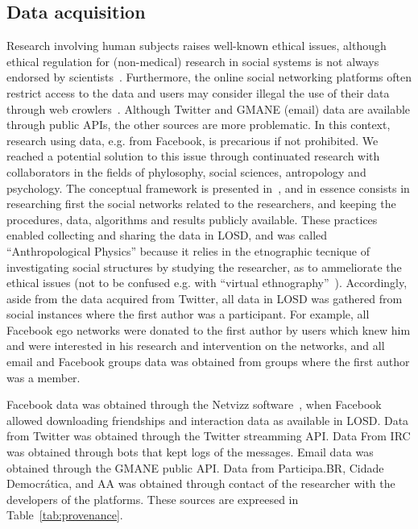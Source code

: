 \documentclass[data,datadescriptor,submit,moreauthors,pdftex]{Definitions/mdpi}
\begin{document}
\subsection{Data acquisition}\label{acq}
Research involving human subjects raises well-known ethical issues,
although ethical regulation for (non-medical) research in social systems
is not always endorsed by scientists~\cite{eth}.
Furthermore, the online social networking platforms often restrict access
to the data and users may consider illegal the use of their data through web crowlers~\cite{ile1,ile2,ile3}.
Although Twitter and GMANE (email) data are available through public APIs,
the other sources are more problematic.
In this context, research using data, e.g. from Facebook, is precarious
if not prohibited.
We reached a potential solution to this issue through continuated research with
collaborators in the fields of phylosophy, social sciences, antropology and psychology.
The conceptual framework is presented in~\cite{antphy,antphy2,antphy3}, and in essence
consists in researching first the social networks related to the researchers,
and keeping the procedures, data, algorithms and results publicly available.
These practices enabled collecting and sharing the data in LOSD,
and was called ``Anthropological Physics'' because it relies in the
etnographic tecnique of investigating social structures
by studying the researcher, as to ammeliorate the ethical issues
(not to be confused e.g. with ``virtual ethnography''~\cite{veth}).
Accordingly, aside from the data acquired from Twitter, all data in LOSD
was gathered from social instances where the first author was a participant.
For example, all Facebook ego networks were donated to the first author by
users which knew him and were interested in his research and intervention on the networks,
and all email and Facebook groups data was obtained from groups where the first author was a member.

Facebook data was obtained through the Netvizz software~\cite{netviz},
when Facebook allowed downloading friendships and interaction data as available in LOSD.
Data from Twitter was obtained through the Twitter streamming API.
Data From IRC was obtained through bots that kept logs of the messages.
Email data was obtained through the GMANE public API.
Data from Participa.BR, Cidade Democrática, and AA was obtained through contact
of the researcher with the developers of the platforms.
These sources are expreesed in Table~\ref{tab:provenance}.
\end{document}
